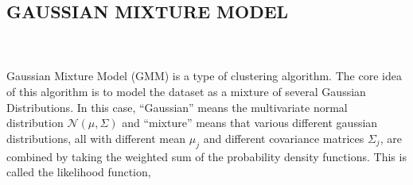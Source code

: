 \documentclass{article}
\begin{document}
\newpage


\subsection {\color{blue}
\textbf{GAUSSIAN MIXTURE MODEL}} \\ \\
Gaussian Mixture Model (GMM) is a type of clustering algorithm. The core idea of this algorithm is to model the dataset as a mixture of several Gaussian Distributions. In this case, “Gaussian” means the multivariate normal distribution $\mathcal{N}(\mu, \Sigma)$ and “mixture” means that various different gaussian distributions, all with different mean $\mu_{j}$ and different covariance matrices $\Sigma_{j}$, are combined by taking the weighted sum of the probability density functions. This is called the likelihood function, 
\end{document}
